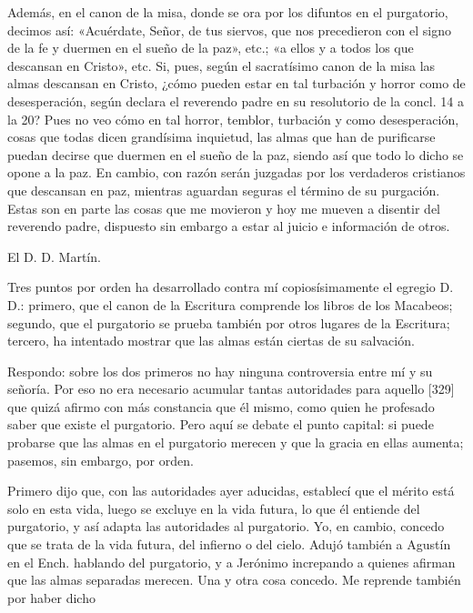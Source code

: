 Además, en el canon de la misa, donde se ora por los difuntos en el purgatorio, decimos así: «Acuérdate, Señor, de tus siervos, que nos precedieron con el signo de la fe y duermen en el sueño de la paz», etc.; «a ellos y a todos los que descansan en Cristo», etc. Si, pues, según el sacratísimo canon de la misa las almas descansan en Cristo, ¿cómo pueden estar en tal turbación y horror como de desesperación, según declara el reverendo padre en su resolutorio de la concl. 14 a la 20? Pues no veo cómo en tal horror, temblor, turbación y como desesperación, cosas que todas dicen grandísima inquietud, las almas que han de purificarse puedan decirse que duermen en el sueño de la paz, siendo así que todo lo dicho se opone a la paz. En cambio, con razón serán juzgadas por los verdaderos cristianos que descansan en paz, mientras aguardan seguras el término de su purgación. Estas son en parte las cosas que me movieron y hoy me mueven a disentir del reverendo padre, dispuesto sin embargo a estar al juicio e información de otros.

El D. D. Martín.

Tres puntos por orden ha desarrollado contra mí copiosísimamente el egregio D. D.: primero, que el canon de la Escritura comprende los libros de los Macabeos; segundo, que el purgatorio se prueba también por otros lugares de la Escritura; tercero, ha intentado mostrar que las almas están ciertas de su salvación.

Respondo: sobre los dos primeros no hay ninguna controversia entre mí y su señoría. Por eso no era necesario acumular tantas autoridades para aquello [329] que quizá afirmo con más constancia que él mismo, como quien he profesado saber que existe el purgatorio. Pero aquí se debate el punto capital: si puede probarse que las almas en el purgatorio merecen y que la gracia en ellas aumenta; pasemos, sin embargo, por orden.

Primero dijo que, con las autoridades ayer aducidas, establecí que el mérito está solo en esta vida, luego se excluye en la vida futura, lo que él entiende del purgatorio, y así adapta las autoridades al purgatorio. Yo, en cambio, concedo que se trata de la vida futura, del infierno o del cielo. Adujó también a Agustín en el Ench. hablando del purgatorio, y a Jerónimo increpando a quienes afirman que las almas separadas merecen. Una y otra cosa concedo. Me reprende también por haber dicho

